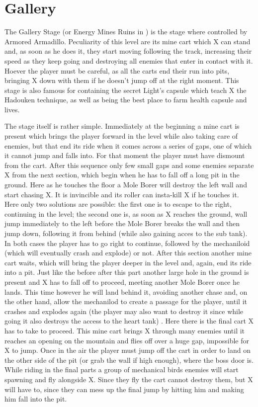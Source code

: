 \section{Gallery}
The Gallery Stage (or Energy Mines Ruins in \mhx) is the stage where controlled by Armored Armadillo. Peculiarity of this level are its mine cart which X can stand and, as soon as he does it, they start moving following the track, increasing their speed as they keep going and destroying all enemies that enter in contact with it. Hoever the player must be careful, as all the carts end their run into pits, bringing X down with them if he doesn't jump off at the right moment. This stage is also famous for containing the secret Light's capsule which teach X the Hadouken technique, as well as being the best place to farm health capsule and lives.

The stage itself is rather simple. Immediately at the beginning a mine cart is present which brings the player forward in the level while also taking care of enemies, but that end its ride when it comes across a series of gaps, one of which it cannot jump and falls into. For that moment the player must have dismount from the cart. After this sequence only few small gaps and some enemies separate X from the next section, which begin when he has to fall off a long pit in the ground. Here as he touches the floor a Mole Borer will destroy the left wall and start chasing X. It is invincible and its roller can insta-kill X if he touches it. Here only two solutions are possible: the first one is to escape to the right, continuing in the level; the second one is, as soon as X reaches the ground, wall jump immediately to the left before the Mole Borer breaks the wall and then jump down, following it from behind (while also gaining acces to the sub tank). In both cases the player has to go right to continue, followed by the mechaniloid (which will eventually crash and explode) or not. After this section another mine cart waits, which will bring the player deeper in the level and, again, end its ride into a pit. Just like the before after this part another large hole in the ground is present and X has to fall off to proceed, meeting another Mole Borer once he lands. This time however he will land behind it, avoiding another chase and, on the other hand, allow the mechanilod to create a passage for the player, until it crashes and explodes again (the player may also want to destroy it since while going it also destroys the access to the heart tank) . Here there is the final cart X has to take to proceed. This mine cart brings X through many enemies until it reaches an opening on the mountain and flies off over a huge gap, impossible for X to jump. Once in the air the player must jump off the cart in order to land on the other side of the pit (or grab the wall if high enough), where the boss door is. While riding in the final parts a group of mechanical birds enemies will start spawning and fly alongside X. Since they fly the cart cannot destroy them, but X will have to, since they can mess up the final jump by hitting him and making him fall into the pit.

